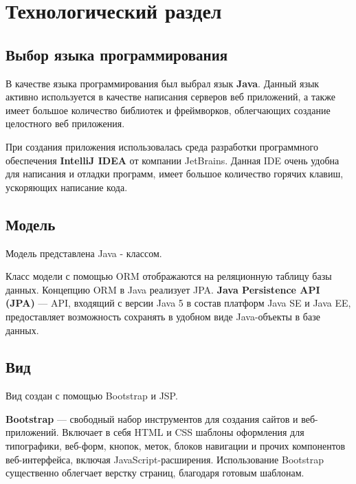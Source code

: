 \chapter{Технологический раздел}

\section{Выбор языка программирования}
В качестве языка программирования был выбрал язык \textbf{Java}. Данный язык активно используется в качестве написания серверов веб приложений, а также имеет большое количество библиотек и фреймворков, облегчающих создание целостного веб приложения.

При создания приложения использовалась среда разработки программного обеспечения \textbf{IntelliJ IDEA} от компании JetBrains. Данная IDE очень удобна для написания и отладки программ, имеет большое количество горячих клавиш, ускоряющих написание кода.  

\section{Модель}

Модель представлена Java - классом.

 

Класс модели с помощью ORM отображаются на реляционную таблицу базы данных. Концепцию ORM в Java реализует JPA. \textbf{Java Persistence API (JPA)} — API, входящий с версии Java 5 в состав платформ Java SE и Java EE, предоставляет возможность сохранять в удобном виде Java-объекты в базе данных.

 

\section{Вид}

Вид создан с помощью Bootstrap и JSP.

\textbf{Bootstrap} — свободный набор инструментов для создания сайтов и веб-приложений. Включает в себя HTML и CSS шаблоны оформления для типографики, веб-форм, кнопок, меток, блоков навигации и прочих компонентов веб-интерфейса, включая JavaScript-расширения. Использование Bootstrap существенно облегчает верстку страниц, благодаря готовым шаблонам.

 

